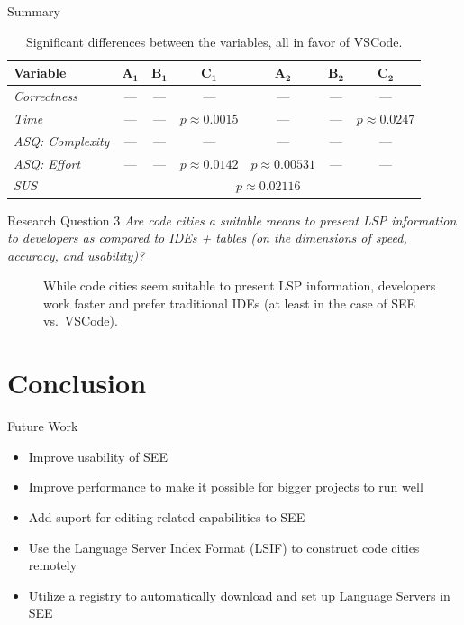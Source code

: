 \documentclass[xcolor={dvipsnames},aspectratio=169,compress,final]{beamer}
\newcommand{\follows}{\raisebox{-0.7mm}{\scalebox{1.4}{\textcolor{Maroon}{\ding{43}}}}}
\newcommand{\answer}[1]{\begin{description}\item[\follows{}]{#1}\end{description}}
\begin{document}
\begin{frame}{Summary}
	\vspace{-0.3cm}
	\begin{table}
		\caption{Significant differences between the variables, all in favor of {VSCode}.}
		\centering
		\begin{tabular}{@{}lcccccc@{}}
			\toprule
			\textbf{Variable}        & $\bm{A_1}$                              & $\bm{B_1}$ & $ \bm{C_1}$        & $\bm{A_2}$          & $\bm{B_2}$ & $\bm{C_2}$         \\\midrule
			\emph{Correctness}       & ---                                     & ---        & ---                & ---                 & ---        & ---                \\
			\emph{Time}              & ---                                     & ---        & $p \approx 0.0015$ & ---                 & ---        & $p \approx 0.0247$ \\
			\emph{{ASQ}: Complexity} & ---                                     & ---        & ---                & ---                 & ---        & ---                \\
			\emph{{ASQ}: Effort}     & ---                                     & ---        & $p \approx 0.0142$ & $p \approx 0.00531$ & ---        & ---                \\
			\emph{{SUS}}             & \multicolumn{6}{c}{$p \approx 0.02116$}                                                                                           \\
			\bottomrule
		\end{tabular}
	\end{table}

	\begin{block}{Research Question 3}
		\emph{Are code cities a suitable means to present LSP information to developers as compared to IDEs + tables (on the dimensions of speed, accuracy, and usability)?}
		\answer{While code cities seem suitable to present LSP information, developers work faster and prefer traditional IDEs (at least in the case of SEE vs.\ VSCode).}
	\end{block}
\end{frame}

\section{Conclusion}

\begin{frame}{Future Work}
	\begin{itemize}
		\item Improve usability of SEE
		\item Improve performance to make it possible for bigger projects to run well
		\item Add suport for editing-related capabilities to SEE
		\item Use the Language Server Index Format (LSIF) to construct code cities remotely
		\item Utilize a registry to automatically download and set up Language Servers in SEE
	\end{itemize}
\end{frame}
\end{document}
